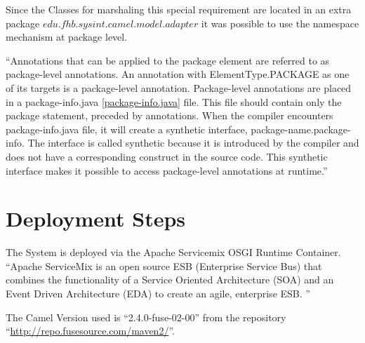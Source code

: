 \documentclass[11pt,english,ngerman, headsepline]{scrreprt}
\begin{document}


Since the Classes for marshaling this special requirement are located in an
extra package $edu.fhb.sysint.camel.model.adapter$ it was possible to use the
namespace mechanism at package level. 


``Annotations that can be applied to the
package element are referred to as package-level annotations. An annotation with
ElementType.PACKAGE as one of its targets is a package-level annotation.
Package-level annotations are placed in a package-info.java
\ref{package-info.java} file. This file should contain only the package statement, preceded by annotations. When the
compiler encounters package-info.java file, it will create a synthetic
interface, package-name.package-info. The interface is called synthetic because
it is introduced by the compiler and does not have a corresponding construct in
the source code. This synthetic interface makes it possible to access
package-level annotations at runtime.\cite{packageinfo}''









\chapter{Deployment Steps}
The System is deployed via the Apache Servicemix OSGI Runtime Container.
``Apache ServiceMix is an open source ESB (Enterprise Service Bus) that combines
 the functionality of a Service Oriented Architecture (SOA) and an Event Driven
 Architecture (EDA)  to create an agile, enterprise ESB.\cite{sm} ''
 
The Camel Version used is ``2.4.0-fuse-02-00'' from the repository
``\url{http://repo.fusesource.com/maven2/}''.
\end{document}
